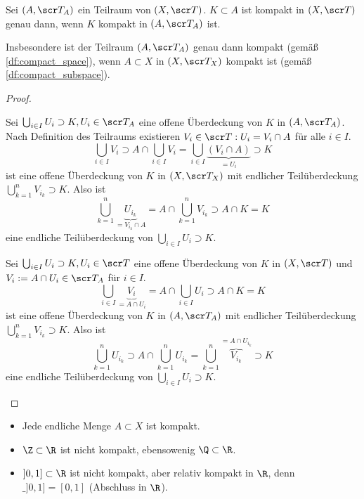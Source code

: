 \begin{nt}
	Sei $(A, \scr T_A)$ ein Teilraum von $(X, \scr T)$.
	$K \subset A$ ist kompakt in $(X, \scr T)$ genau dann, wenn $K$ kompakt in $(A, \scr T_A)$ ist.

	Insbesondere ist der Teilraum $(A, \scr T_A)$ genau dann kompakt (gemäß \ref{df:compact_space}), wenn $A \subset X$ in $(X, \scr T_X)$ kompakt ist (gemäß \ref{df:compact_subspace}).
	\begin{proof}
		\begin{segnb}[„$\implies$“]
			Sei $\bigcup_{i\in I} U_i \supset K, U_i \in \scr T_A$ eine offene Überdeckung von $K$ in $(A, \scr T_A)$.
			Nach Definition des Teilraums existieren $V_i \in \scr T : U_i = V_i \cap A$ für alle $i \in I$.
			\[
				\bigcup_{i\in I} V_i
				\supset A \cap \bigcup_{i\in I} V_i
				= \bigcup_{i\in I} \underbrace{(V_i \cap A)}_{= U_i}
				\supset K
			\]
			ist eine offene Überdeckung von $K$ in $(X, \scr T_X)$ mit endlicher Teilüberdeckung $\bigcup_{k=1}^n V_{i_k} \supset K$.
			Also ist
			\[
				\bigcup_{k=1}^n \underbrace{U_{i_k}}_{= V_{i_k} \cap A}
				= A \cap \bigcup_{k=1}^n V_{i_k}
				\supset A \cap K
				= K
			\]
			eine endliche Teilüberdeckung von $\bigcup_{i\in I} U_i \supset K$.
		\end{segnb}
		\begin{segnb}[„$\impliedby$“]
			Sei $\bigcup_{i\in I} U_i \supset K, U_i \in \scr T$ eine offene Überdeckung von $K$ in $(X, \scr T)$ und $V_i := A \cap U_i \in \scr T_A$ für $i \in I$.
			\[
				\bigcup_{i\in I} \underbrace{V_i}_{=A \cap U_i}
				= A \cap \bigcup_{i\in I} U_i
				\supset A \cap K
				= K
			\]
			ist eine offene Überdeckung von $K$ in $(A, \scr T_A)$ mit endlicher Teilüberdeckung $\bigcup_{k=1}^n V_{i_k} \supset K$.
			Also ist
			\[
				\bigcup_{k=1}^n U_{i_k}
				\supset A \cap \bigcup_{k=1}^n U_{i_k}
				= \bigcup_{k=1}^n \overbrace{V_{i_k}}^{=A \cap U_{i_k}}
				\supset K
			\]
			eine endliche Teilüberdeckung von $\bigcup_{i\in I} U_i \supset K$.
		\end{segnb}
	\end{proof}
\end{nt}

\begin{ex}
	\begin{itemize}
		\item
			Jede endliche Menge $A \subset X$ ist kompakt.
		\item
			$\Z \subset \R$ ist nicht kompakt, ebensowenig $\Q \subset \R$.
		\item
			$]0,1] \subset \R$ ist nicht kompakt, aber relativ kompakt in $\R$, denn $\_{]0,1]} = [0,1]$ (Abschluss in $\R$).
	\end{itemize}
\end{ex}

